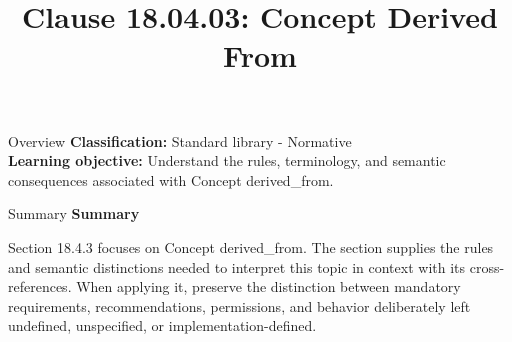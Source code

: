 \documentclass[10pt,letterpaper]{article}
\title{Clause 18.04.03: Concept Derived From}
\author{}
\date{}
\begin{document}
\maketitle
\begin{CornellOverviewBox}{Overview}
\textbf{Classification:} Standard library - Normative\\[2pt]
\textbf{Learning objective:} Understand the rules, terminology, and semantic consequences associated with Concept derived\_from.
\end{CornellOverviewBox}\begin{CornellSummaryBox}{Summary}
{\sffamily\bfseries\color{Accent} Summary}\par\vspace{3pt}Section 18.4.3 focuses on Concept derived\_from. The section supplies the rules and semantic distinctions needed to interpret this topic in context with its cross-references. When applying it, preserve the distinction between mandatory requirements, recommendations, permissions, and behavior deliberately left undefined, unspecified, or implementation-defined.
\end{CornellSummaryBox}
\end{document}
